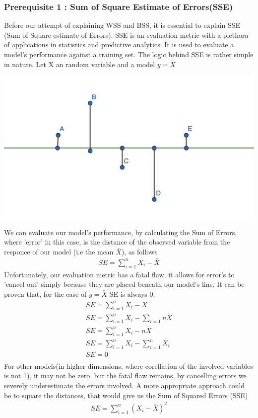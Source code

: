 \documentclass[12pt]{article}
\begin{document}
			\subsubsection*{Prerequisite 1 : Sum of Square Estimate of Errors(SSE)}
				Before our attempt of explaining WSS and BSS, it is essential to explain SSE (Sum of Square estimate of Errors). SSE is an evaluation metric with a plethora of applications in statistics and predictive analytics\cite{???}. It is used to evaluate a model's performance against a training set\cite{???}. The logic behind SSE is rather simple in nature. Let X an random variable and a model $y=\bar{X}$
				\begin{center}
					\includegraphics[scale=0.5]{res/SSE-1}
				\end{center}
				We can evaluate our model's performance, by calculating the Sum of Errors, where 'error' in this case, is the distance of the observed variable from the responce of our model (i.e the mean $\bar{X}$), as follows
				\begin{align}
					SE = \sum_{i=1}^{n}{X_i-\bar{X}}
				\end{align}
				Unfortunately, our evaluation metric has a fatal flaw, it allows for error's to 'cancel out' simply because they are placed beneath our model's line. It can be proven that, for the case of $y=\bar{X}$ SE is always 0.
				\begin{align}
					SE = \sum_{i=1}^{n}{X_i-\bar{X}} \\
					SE = \sum_{i=1}^{n}{X_i} - \sum_{i=1}{n}{\bar{X}} \\
					SE = \sum_{i=1}^{n}{X_i} - n\bar{X} \\
					SE = \sum_{i=1}^{n}{X_i} - \sum_{i=1}^{n}{X_i} \\
					SE = 0 \\
				\end{align}
				For other models(in higher dimensions, where corellation of the involved variables is not 1), it may not be zero, but the fatal flaw remains, by cancelling errors we severely underestimate the errors involved. A more appropriate approach could be to square the distances, that would give us the Sum of Squared Errors (SSE)
				\begin{align}
					SE = \sum_{i=1}^{n}{(X_i-\bar{X})}^2
				\end{align}
\end{document}
